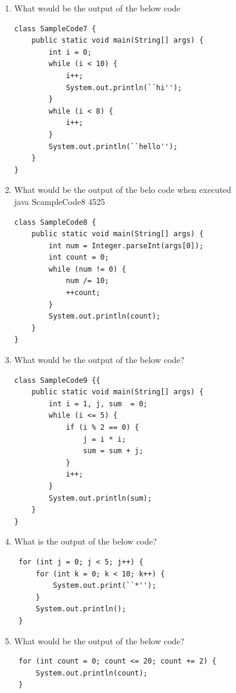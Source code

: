 \documentclass[11pt,a4paper]{article}
\def\AnswerBox{\fbox{\begin{minipage}{4in}\hfill\vspace{0.5in}\end{minipage}}}
\begin{document}
\begin{enumerate}
\AnswerBox

\item What would be the output of the below code
\begin{lstlisting}
class SampleCode7 {
    public static void main(String[] args) {
        int i = 0;
        while (i < 10) {
            i++;
            System.out.println(``hi'');
        }  
        while (i < 8) {
            i++;
        }
        System.out.println(``hello'');
    }
}    
\end{lstlisting}

\AnswerBox

\item What would be the output of the belo code when executed\\
    java ScampleCode8 4525
\begin{lstlisting}
class SampleCode8 {
    public static void main(String[] args) {
        int num = Integer.parseInt(args[0]);
        int count = 0;
        while (num != 0) {
            num /= 10;            
            ++count;
        }
        System.out.println(count);
    }
}
\end{lstlisting}
\AnswerBox

\item What would be the output of the below code?
\begin{lstlisting}
class SampleCode9 {{
    public static void main(String[] args) {
        int i = 1, j, sum  = 0;
        while (i <= 5) {
            if (i % 2 == 0) {
                j = i * i;
                sum = sum + j;
            }
            i++;
        }
        System.out.println(sum);
    }
}
\end{lstlisting}
\AnswerBox

\item What is the output of the below code?
\begin{lstlisting}
 for (int j = 0; j < 5; j++) {
     for (int k = 0; k < 10; k++) {
         System.out.print(``*'');
     }
     System.out.println();
 }
\end{lstlisting}

\AnswerBox

\item What would be the output of the below code?
\begin{lstlisting}
 for (int count = 0; count <= 20; count += 2) {
     System.out.println(count);
 }
\end{lstlisting}

\AnswerBox


\end{enumerate}
\end{document}
